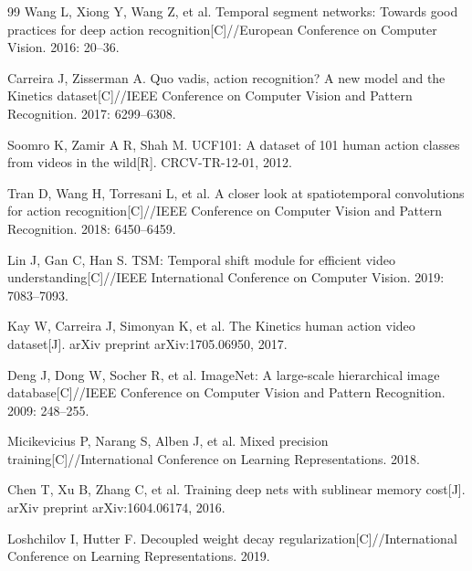 
\begin{thebibliography}{99}
Wang L, Xiong Y, Wang Z, et al. Temporal segment networks: Towards good
practices for deep action recognition[C]//European Conference on Computer
Vision. 2016: 20--36.

Carreira J, Zisserman A. Quo vadis, action recognition? A new model and the
Kinetics dataset[C]//IEEE Conference on Computer Vision and Pattern
Recognition. 2017: 6299--6308.

Soomro K, Zamir A R, Shah M. UCF101: A dataset of 101 human action classes
from videos in the wild[R]. CRCV-TR-12-01, 2012.

Tran D, Wang H, Torresani L, et al. A closer look at spatiotemporal
convolutions for action recognition[C]//IEEE Conference on Computer Vision
and Pattern Recognition. 2018: 6450--6459.

Lin J, Gan C, Han S. TSM: Temporal shift module for efficient video
understanding[C]//IEEE International Conference on Computer Vision. 2019:
7083--7093.

Kay W, Carreira J, Simonyan K, et al. The Kinetics human action video
dataset[J]. arXiv preprint arXiv:1705.06950, 2017.

Deng J, Dong W, Socher R, et al. ImageNet: A large-scale hierarchical image
database[C]//IEEE Conference on Computer Vision and Pattern Recognition.
2009: 248--255.

Micikevicius P, Narang S, Alben J, et al. Mixed precision
training[C]//International Conference on Learning Representations. 2018.

Chen T, Xu B, Zhang C, et al. Training deep nets with sublinear memory
cost[J]. arXiv preprint arXiv:1604.06174, 2016.

Loshchilov I, Hutter F. Decoupled weight decay
regularization[C]//International Conference on Learning Representations. 2019.
\end{thebibliography}
